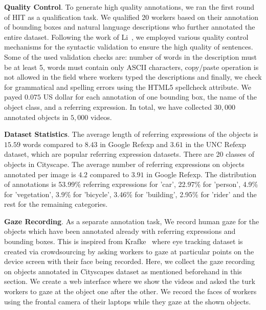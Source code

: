 \documentclass[10pt,twocolumn,letterpaper]{article}
\begin{document}
\bigskip
\noindent
\textbf{Quality Control}. To generate high quality annotations, we ran the first round of HIT as a qualification task. We qualified 20 workers based on their annotation of bounding boxes and natural language descriptions who further annotated the entire dataset. %
Following the work of Li~\etal \cite{li2016tgif}, we employed various quality control mechanisms for the syntactic validation to ensure the high quality of sentences. Some of the used validation checks are: number of words in the description must be at least 5, words must contain only ASCII characters, copy/paste operation is not allowed in the field where workers typed the descriptions and finally, we check for grammatical and spelling errors using the HTML5 spellcheck attribute. We payed $0.075$ US dollar for each annotation of one bounding box, the name of the object class, and a referring expression. In total, we have collected $30,000$ annotated objects in $5,000$ videos.  %

\bigskip
\noindent
\textbf{Dataset Statistics}. The average length of referring expressions of the objects is $15.59$ words compared to $8.43$ in Google Refexp and $3.61$ in the UNC Refexp dataset, which are popular referring expression datasets. 
There are 20 classes of objects in Cityscape. The average number of referring expressions on objects annotated per image is $4.2$ compared to $3.91$ in Google Refexp. The distribution of annotations is 53.99\% referring expressions for 'car', 22.97\% for 'person', 4.9\% for 'vegetation', 3.9\% for 'bicycle', 3.46\% for 'building', 2.95\% for 'rider' and the rest for the remaining categories. %

\bigskip
\noindent
\textbf{Gaze Recording}. As a separate annotation task, We record human gaze for the objects which have been annotated already with referring expressions and bounding boxes. This is inspired from Krafke~\etal \cite{krafka2016eye} where eye tracking dataset is created via crowdsourcing by asking workers to gaze at particular points on the device screen with their face being recorded. Here, we collect the gaze recording on objects annotated in Cityscapes dataset as mentioned beforehand in this section. We create a web interface where we show the videos and asked the turk workers to gaze at the object one after the other. We record the faces of workers using the frontal camera of their laptops while they gaze at the shown objects.
\end{document}
